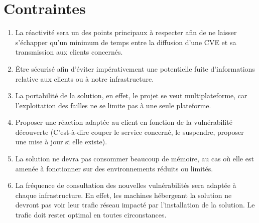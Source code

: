\section{Contraintes}
\begin{enumerate}
\item La réactivité sera un des points principaux à respecter afin de ne laisser s’échapper qu’un minimum de temps entre la diffusion d’une CVE et sa transmission aux clients concernés.\\
\item Être sécurisé afin d’éviter impérativement une potentielle fuite d’informations relative aux clients ou à notre infrastructure.\\
\item La portabilité de la solution, en effet, le projet se veut multiplateforme, car l’exploitation des failles ne se limite pas à une seule plateforme.\\
\item Proposer une réaction adaptée au client en fonction de la vulnérabilité découverte (C’est-à-dire couper le service concerné, le suspendre, proposer une mise à jour si elle existe).\\
\item La solution ne devra pas consommer beaucoup de mémoire, au cas où elle est amenée à fonctionner sur des environnements réduits ou limités.\\
\item La fréquence de consultation des nouvelles vulnérabilités sera adaptée à chaque infrastructure. En effet, les machines hébergeant la solution ne devront pas voir leur trafic réseau impacté par l’installation de la solution. Le trafic doit rester optimal en toutes circonstances.\\
\end{enumerate}